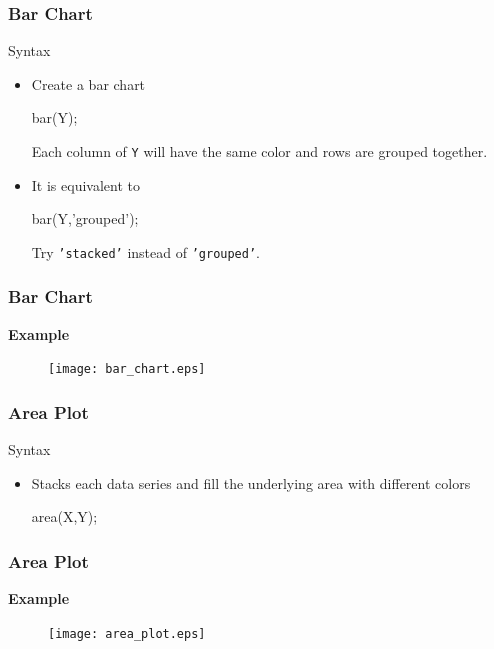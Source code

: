 \documentclass[compress]{beamer}  %
\begin{document}
\begin{frame}[fragile]
\frametitle{Bar Chart}

\begin{block}{Syntax}
\begin{itemize}[<+->]
    \item Create a bar chart
          \begin{matlabcodebeamer}[numbers=none,frame=none]
          bar(Y);
          \end{matlabcodebeamer}
          Each column of \texttt{Y} will have the same color and rows are grouped together.
    \item It is equivalent to
          \begin{matlabcodebeamer}[numbers=none,frame=none]
          bar(Y,'grouped');
          \end{matlabcodebeamer}
          Try \texttt{'stacked'} instead of \texttt{'grouped'}.
\end{itemize}
\end{block}

\end{frame}
\begin{frame}[fragile]
\frametitle{Bar Chart}
\textbf{Example} 

\setcounter{subfigure}{0}
\begin{figure}
    \centering
    \texttt{[image: bar\_chart.eps]}
\end{figure}

\end{frame}
\begin{frame}[fragile]
\frametitle{Area Plot}

\begin{block}{Syntax}
\begin{itemize}
    \item Stacks each data series and fill the underlying area with different colors
          \begin{matlabcodebeamer}[numbers=none,frame=none]
          area(X,Y);
          \end{matlabcodebeamer}
\end{itemize}
\end{block}

\end{frame}
\begin{frame}[fragile]
\frametitle{Area Plot}
\textbf{Example} 

\setcounter{subfigure}{0}
\begin{figure}
    \centering
    \texttt{[image: area\_plot.eps]}
\end{figure}

\end{frame}
\end{document}
